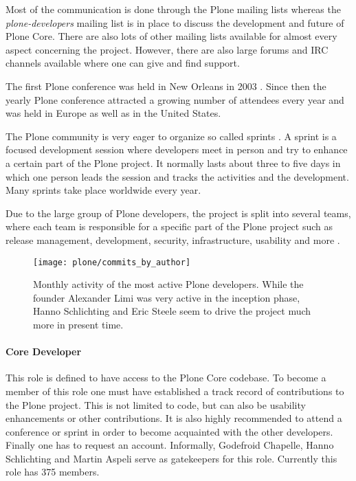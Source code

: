 Most of the communication is done through the Plone mailing lists whereas the
\emph{plone-developers} mailing list is in place to discuss the development and
future of Plone Core. There are also lots of other mailing lists available for
almost every aspect concerning the project. However, there are also large
forums and \ac{IRC} channels available where one can give and find support.

The first Plone conference was held in New Orleans in 2003
\cite{PloneConferences}. Since then the yearly Plone conference attracted a
growing number of attendees every year and was held in Europe as well as in the
United States.

The Plone community is very eager to organize so called sprints
\cite{PloneSprints}. A sprint is a focused development session where developers
meet in person and try to enhance a certain part of the Plone project. It
normally lasts about three to five days in which one person leads the session
and tracks the activities and the development. Many sprints take place
worldwide every year.

Due to the large group of Plone developers, the project is split into several
teams, where each team is responsible for a specific part of the Plone project
such as release management, development, security, infrastructure, usability
and more
\cite{PloneFounders,PloneReleaseManagers,PloneFrameworkTeam,PloneContribute}.

\begin{figure}[thbp]
  \centering
  \texttt{[image: plone/commits\_by\_author]}
  \caption[Commits by Most Active Authors, Plone]
  {Monthly activity of the most active Plone developers. While the founder
    Alexander Limi was very active in the inception phase, Hanno Schlichting
    and Eric Steele seem to drive the project much more in present time.}
  \label{fig:plone:cba}
\end{figure}

\paragraph{Core Developer}

This role is defined to have access to the Plone Core codebase. To become a
member of this role one must have established a track record of contributions
to the Plone project. This is not limited to code, but can also be usability
enhancements or other contributions. It is also highly recommended to attend a
conference or sprint in order to become acquainted with the other developers.
Finally one has to request an account. Informally, Godefroid Chapelle, Hanno
Schlichting and Martin Aspeli serve as gatekeepers for this role. Currently
this role has 375 members.

